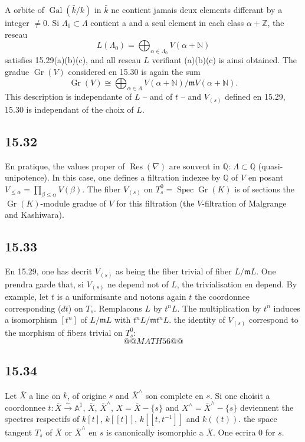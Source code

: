 \documentclass[12pt,a4paper]{article}
\theoremstyle{plain}
\theoremstyle{definition}
\theoremstyle{remark}
\DeclareMathOperator{\Spec}{Spec}
\DeclareMathOperator{\Gr}{Gr}
\DeclareMathOperator{\Res}{Res}
\DeclareMathOperator{\Gal}{Gal}
\newcommand{\bZ}{\mathbb{Z}}
\newcommand{\bQ}{\mathbb{Q}}
\newcommand{\bA}{\mathbb{A}}
\newcommand{\bN}{\mathbb{N}}
\begin{document}
A orbite of $\Gal(\bar{k}/k)$ in $\bar{k}$ ne contient jamais deux elements differant by a integer $\neq 0$. Si $\Lambda_0 \subset \Lambda$ contient a and a seul element in each class $\alpha + \bZ$, the reseau
\[
L(\Lambda_0) = \bigoplus_{\alpha \in \Lambda_0} V(\alpha + \bN)
\]
satisfies 15.29(a)(b)(c), and all reseau $L$ verifiant (a)(b)(c) is ainsi obtained. The gradue $\Gr(V)$ considered en 15.30 is again the sum
\[
\Gr(V) \cong \bigoplus_{\alpha \in \Lambda} V(\alpha + \bN)/\mathfrak{m}V(\alpha + \bN).
\]
This description is independante of $L$ -- and of $t$ -- and $V_{(s)}$ defined en 15.29, 15.30 is independant of the choix of $L$.

\subsection*{15.32}

En pratique, the values proper of $\Res(\nabla)$ are souvent in $\bQ$: $\Lambda \subset \bQ$ (quasi-unipotence). In this case, one defines a filtration indexee by $\bQ$ of $V$ en posant $V_{\leqslant \alpha} = \prod_{\beta \leqslant \alpha} V(\beta)$. The fiber $V_{(s)}$ on $T_s^0 = \Spec \Gr(K)$ is of sections the $\Gr(K)$-module gradue of $V$ for this filtration (the $V$-filtration of Malgrange and Kashiwara).

\subsection*{15.33}

En 15.29, one has decrit $V_{(s)}$ as being the fiber trivial of fiber $L/\mathfrak{m}L$. One prendra garde that, si $V_{(s)}$ ne depend not of $L$, the trivialisation en depend. By example, let $t$ is a uniformisante and notons again $t$ the coordonnee corresponding ($dt$) on $T_s$. Remplacons $L$ by $t^n L$. The multiplication by $t^n$ induces a isomorphism $[t^n]$ of $L/\mathfrak{m}L$ with $t^n L/\mathfrak{m} t^n L$. the identity of $V_{(s)}$ correspond to the morphism of fibers trivial on $T_s^0$:
\[
@@MATH56@@
\]

\subsection*{15.34}

Let $\overline{X}$ a line on $k$, of origine $s$ and $\overline{X}^\wedge$ son complete en $s$. Si one choisit a coordonnee $t: \overline{X} \xrightarrow{\sim} \bA^1$, $\overline{X}$, $\overline{X}^\wedge$, $X = \overline{X} - \{s\}$ and $X^\wedge = \overline{X}^\wedge - \{s\}$ deviennent the spectres respectifs of $k[t]$, $k[[t]]$, $k[[t, t^{-1}]]$ and $k((t))$. the space tangent $T_s$ of $\overline{X}$ or $\overline{X}^\wedge$ en $s$ is canonically isomorphic a $\overline{X}$. One ecrira $0$ for $s$.
\end{document}

